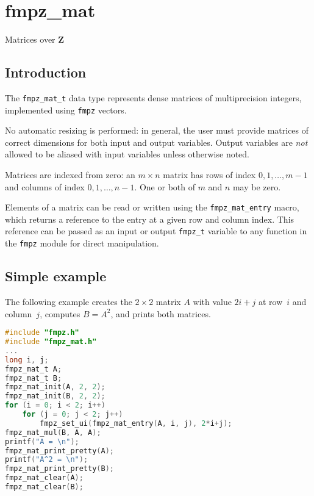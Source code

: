 \documentclass[a4paper,10pt]{book}
\newcommand{\Z}{\mathbf{Z}}%
\newcommand{\code}{\lstinline}
\begin{document}



\chapter{fmpz\_mat}
\epigraph{Matrices over $\Z$}{}

\section{Introduction}

The \code{fmpz_mat_t} data type represents dense matrices of multiprecision
integers, implemented using \code{fmpz} vectors.

No automatic resizing is performed: in general, the user must provide
matrices of correct dimensions for both input and output variables. Output
variables are \emph{not} allowed to be aliased with input variables unless
otherwise noted.

Matrices are indexed from zero: an $m \times n$ matrix
has rows of index $0,1,\ldots,m-1$ and columns of
index $0,1,\ldots,n-1$. One or both of $m$ and $n$ may be zero.

Elements of a matrix can be read or written using the \code{fmpz_mat_entry}
macro, which returns a reference to the entry at a given row and column index.
This reference can be passed as an input or output \code{fmpz_t} variable to 
any function in the \code{fmpz} module for direct manipulation.

\section{Simple example}
The following example creates the $2 \times 2$ matrix $A$ with
value $2i+j$ at row~$i$ and column~$j$, computes $B = A^2$,
and prints both matrices.

\begin{lstlisting}[language=c]
#include "fmpz.h"
#include "fmpz_mat.h"
...
long i, j;
fmpz_mat_t A;
fmpz_mat_t B;
fmpz_mat_init(A, 2, 2);
fmpz_mat_init(B, 2, 2);
for (i = 0; i < 2; i++)
    for (j = 0; j < 2; j++)
        fmpz_set_ui(fmpz_mat_entry(A, i, j), 2*i+j);
fmpz_mat_mul(B, A, A);
printf("A = \n");
fmpz_mat_print_pretty(A);
printf("A^2 = \n");
fmpz_mat_print_pretty(B);
fmpz_mat_clear(A);
fmpz_mat_clear(B);
\end{lstlisting}
\end{document}
